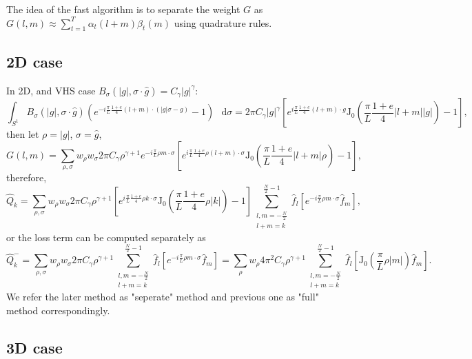 \documentclass[review, times]{elsarticle}
\newcommand*\diff{\mathop{}\!\mathrm{d}}
\begin{document}
The idea of the fast algorithm is to separate the weight $G$ as $G(l,m)\approx\sum_{t=1}^T\alpha_t(l+m)\beta_t(m)$ using quadrature rules.

\subsection{2D case}

In 2D, and VHS case $B_{\sigma}(|g|,\sigma\cdot \hat{g})=C_{\gamma}|g|^{\gamma}$:
\begin{equation}
  \int_{S^1}B_{\sigma}(|g|,\sigma\cdot \hat{g})\left(e^{-i\frac{\pi}{L}\frac{1+e}{4}(l+m)\cdot (|g|\sigma-g)}-1\right)\,\diff{\sigma}=2\pi C_{\gamma}|g|^{\gamma}\left[ e^{i\frac{\pi}{L}\frac{1+e}{4}(l+m)\cdot g}\text{J}_0\left(\frac{\pi}{L}\frac{1+e}{4}|l+m||g|\right)-1\right],
\end{equation}
then let $\rho=|g|$, $\sigma=\hat{g}$,
\begin{equation}
  G(l,m)=\sum_{\rho,\sigma}w_{\rho}w_{\sigma}2\pi C_{\gamma}\rho^{\gamma+1}e^{-i\frac{\pi}{L}\rho m \cdot \sigma}\left[ e^{i\frac{\pi}{L}\frac{1+e}{4}\rho (l+m)\cdot \sigma}\text{J}_0\left(\frac{\pi}{L}\frac{1+e}{4}|l+m|\rho\right)-1\right],
\end{equation}
therefore,
\begin{equation} 
  \hat{Q}_k=\sum_{\rho,\sigma}w_{\rho}w_{\sigma}2\pi C_{\gamma}\rho^{\gamma+1}\left[ e^{i\frac{\pi}{L}\frac{1+e}{4}\rho k\cdot \sigma}\text{J}_0\left(\frac{\pi}{L}\frac{1+e}{4}\rho |k|\right)-1\right]\sum_{\substack{l,m=-\frac{N}{2}\\l+m=k}}^{\frac{N}{2}-1}\hat{f}_l \left[e^{-i\frac{\pi}{L}\rho m \cdot \sigma}\hat{f}_m\right],
\end{equation} 
or the loss term can be computed separately as
\begin{equation} 
\hat{Q}_k^-=\sum_{\rho,\sigma}w_{\rho}w_{\sigma}2\pi C_{\gamma}\rho^{\gamma+1}\sum_{\substack{l,m=-\frac{N}{2}\\l+m=k}}^{\frac{N}{2}-1}\hat{f}_l \left[e^{-i\frac{\pi}{L}\rho m \cdot \sigma}\hat{f}_m\right]=\sum_{\rho}w_{\rho}4\pi^2 C_{\gamma}\rho^{\gamma+1}\sum_{\substack{l,m=-\frac{N}{2}\\l+m=k}}^{\frac{N}{2}-1}\hat{f}_l \left[\text{J}_0\left(\frac{\pi}{L}\rho |m|\right)\hat{f}_m\right].
\end{equation}
We refer the later method as "seperate" method and previous one as "full" method correspondingly.

\subsection{3D case}
\end{document}
